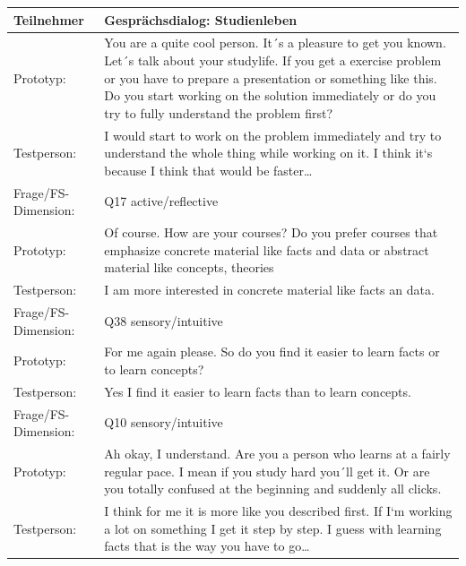 \begingroup
  \footnotesize 
\begin{longtable}{|m{2.5cm}|m{12.0cm}|}
  \hline     
  \rowcolor[HTML]{EFEFEF}                                         
  \textbf{Teilnehmer} & \textbf{Gesprächsdialog: Studienleben } \\ 
  \hline \hline  
  Prototyp: & You are a quite cool person. It´s a pleasure to get you known. Let´s talk about your studylife.
  If you get a exercise problem or you have to prepare a presentation or something like this. 
  Do you start working on the solution immediately 
  or do you try to fully understand the problem first?\\  \hline  
  Testperson: & I would start to work on the problem immediately and try to understand the whole thing while working on it.  
            I think it‘s because I think that would be faster…\\ \hline
             

  Frage/FS-Dimension: & Q17 active/reflective \\ \hline
\hline 

Prototyp: & Of course. How are your courses? Do you prefer courses that emphasize concrete material like facts and data or abstract material like 
            concepts, theories\\  \hline  
Testperson: & I am more interested in  concrete material like facts an data.  \\ \hline
Frage/FS-Dimension: & Q38 sensory/intuitive \\ \hline 
\hline

Prototyp: & For me again please. So do you find it easier to learn facts or to learn concepts?\\  \hline  
Testperson: &Yes I find it easier to learn facts than to learn concepts. \\ \hline
 

Frage/FS-Dimension: & Q10 sensory/intuitive \\ \hline   
\hline

Prototyp: & Ah okay, I understand. Are you a person who learns at a fairly regular pace. I mean if you study hard you´ll get it.
Or are you totally confused at the beginning and suddenly all clicks.  \\  \hline  
Testperson: & I think for me it is more like you described first. If I‘m working a lot on something I get it step by step. I guess with learning facts that is the way you have to go… \\ \hline
 


\end{longtable}
